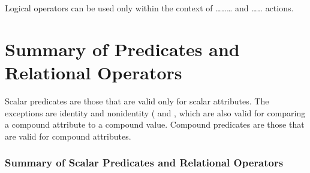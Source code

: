 \begin{note}
  Logical operators can be used only within the context of
  \ldots{}\ldots{}\ldots{} and
  \ldots{}\ldots{} actions.
\end{note}

\section{Summary of Predicates and Relational Operators}

Scalar predicates are those that are valid only for scalar
attributes. The exceptions are identity and nonidentity (\co{==} and
\co{<>}, which are also valid for comparing a compound attribute to a
compound value. Compound predicates are those that are valid for
compound attributes.

\subsubsection{Summary of Scalar Predicates and Relational Operators}

